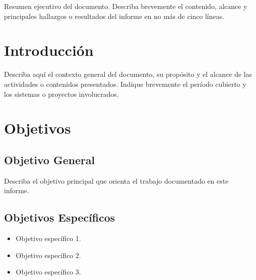 \documentclass[12pt, a4paper, oneside]{article}
\newcommand{\ColorPrincipal}{AzulITM}
\newcommand{\ResumenEjecutivo}{%
  Resumen ejecutivo del documento. Describa brevemente el
  contenido, alcance y principales hallazgos o resultados
  del informe en no más de cinco líneas.
}
\begin{document}
\vspace{0.8cm}

\begin{tcolorbox}[
  colframe    = \ColorPrincipal,
  colback     = GrisClaro,
  colbacktitle= \ColorPrincipal,
  coltitle    = white,
  title       = {{\FuenteTitulo\small\bfseries Resumen Ejecutivo}},
  arc         = 3pt,
  enhanced
]
\ResumenEjecutivo
\end{tcolorbox}

\newpage

\tableofcontents
\newpage


\section{Introducción}

Describa aquí el contexto general del documento, su propósito
y el alcance de las actividades o contenidos presentados.
Indique brevemente el período cubierto y los sistemas o
proyectos involucrados.

\section{Objetivos}

\subsection{Objetivo General}
Describa el objetivo principal que orienta el trabajo
documentado en este informe.

\subsection{Objetivos Específicos}
\begin{itemize}[label={\color{\ColorPrincipal}>}, leftmargin=1.5em]
  \item Objetivo específico 1.
  \item Objetivo específico 2.
  \item Objetivo específico 3.
\end{itemize}
\end{document}
